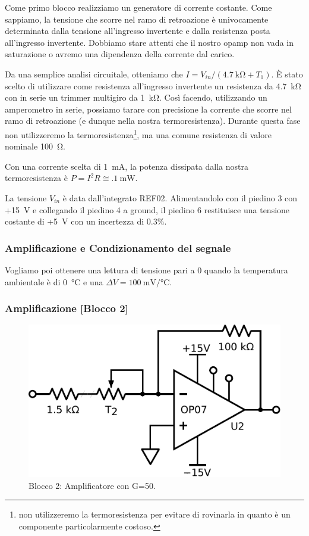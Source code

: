 Come primo blocco realizziamo un generatore di corrente costante.
Come sappiamo, la tensione che scorre nel ramo di retroazione è univocamente determinata dalla tensione all'ingresso invertente e dalla resistenza posta all'ingresso invertente.
Dobbiamo stare attenti che il nostro opamp non vada in saturazione o avremo una dipendenza della corrente dal carico.

Da una semplice analisi circuitale, otteniamo che $I=V_{in}/(\SI{4.7}{\kohm}+T_1)$.
È stato scelto di utilizzare come resistenza all'ingresso invertente un resistenza da \SI{4.7}{\kilo\ohm} con in serie un trimmer multigiro da \SI{1}{\kilo\ohm}.
Così facendo, utilizzando un amperometro in serie, possiamo tarare con precisione la corrente che scorre nel ramo di retroazione (e dunque nella nostra termoresistenza).
Durante questa fase non utilizzeremo la termoresistenza\footnote{non utilizzeremo la termoresistenza per evitare di rovinarla in quanto è un componente particolarmente costoso.}, ma una comune resistenza di valore nominale \SI{100}{\ohm}.

Con una corrente scelta di \SI{1}{\milli\ampere}, la potenza dissipata dalla nostra termoresistenza è $P=I^2 R \cong \SI{.1}{\mW}$.

La tensione $V_{in}$ è data dall'integrato REF02.
Alimentandolo con il piedino 3 con +\SI{15}{\volt} e collegando il piedino 4 a ground, il piedino 6 restituisce una tensione costante di +\SI{5}{\volt} con un incertezza di \num{0.3}$\%$.

\subsubsection{Amplificazione e Condizionamento del segnale}
Vogliamo poi ottenere una lettura di tensione pari a \num{0} quando la temperatura ambientale è di \SI{0}{\celsius} e una $\Delta V=\SI{100}{\milli\volt}/\si{\celsius}$.

\subsubsection*{Amplificazione [Blocco 2]}

\begin{figure}
\centering
\includegraphics[width=.3\textwidth]{../E06/latex/P2.pdf}
\caption{Blocco 2: Amplificatore con G=50.}
\label{cir5:2wire}
\end{figure}

